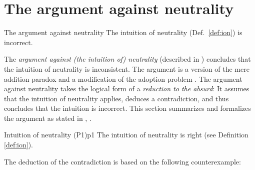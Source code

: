 \section{The argument against neutrality}
\label{sec:arg}

\begin{Theorem}{The argument against neutrality}{}
The intuition of neutrality (Def.~\ref{def:ion}) is incorrect.
\end{Theorem}

The \emph{argument against (the intuition of) neutrality} (described in ) concludes that the intuition of neutrality is inconsistent. The argument is a version of the mere addition paradox \cite[p.~148]{broome_2004} and a modification of the adoption problem \cite[p.~161]{broome_2004}. The argument against neutrality takes the logical form of a \emph{reduction to the absurd}: It assumes that the intuition of neutrality applies, deduces a contradiction, and thus concludes that the intuition is incorrect. This section summarizes and formalizes the argument as stated in , . 

\begin{Premise}{Intuition of neutrality (P1)}{p1}
The intuition of neutrality is right (see Definition \ref{def:ion}).
\end{Premise}

The deduction of the contradiction is based on the following counterexample: 

